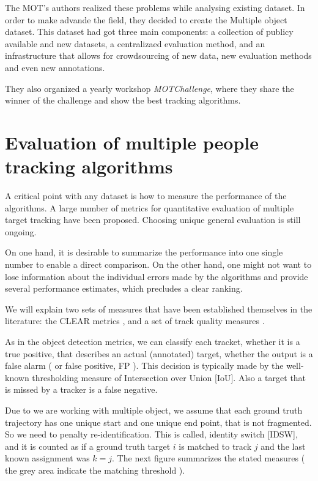 The MOT's authors realized these problems while analysing existing dataset. In order to make advande the field, they decided to create the Multiple object dataset. This dataset had got three main components: a collection of publicy available and new datasets, a centralizaed evaluation method, and an infrastructure that allows for crowdsourcing of new data, new evaluation methods and even new annotations.

They also organized a yearly workshop \textit{MOTChallenge}, where they share the winner of the challenge and show the best tracking algorithms.

\section{Evaluation of multiple people tracking algorithms}\label{datasetracksEval}

A critical point with any dataset is how to measure the performance of the algorithms. A large number of metrics for quantitative evaluation of multiple target tracking have been proposed. Choosing unique general evaluation is still ongoing. 

On one hand, it is desirable to summarize the performance into one single number to enable a direct comparison. On the other hand, one might not want to lose information about the individual errors made by the algorithms and provide several performance estimates, which precludes a clear ranking.


We will explain two sets of measures that have been established themselves in the literature: the CLEAR metrics \cite{clear}, and a set of track quality measures \cite{wu}.

As in the object detection metrics, we can classify each tracket, whether it is a true positive, that describes an actual (annotated) target, whether the output is a false alarm ( or false positive, FP ). This decision is typically made by the well-known thresholding measure of Intersection over Union [IoU]. Also a target that is missed by a tracker is a false negative.

Due to we are working with multiple object, we assume that each ground truth trajectory has one unique start and one unique end point, that is not fragmented. So we need to penalty re-identification. This is called, identity switch [IDSW], and it is counted as if a ground truth target $i$ is matched to track $j$ and the last known assignment was $ k = j$. The next figure summarizes the stated measures ( the grey area indicate the matching threshold ).


